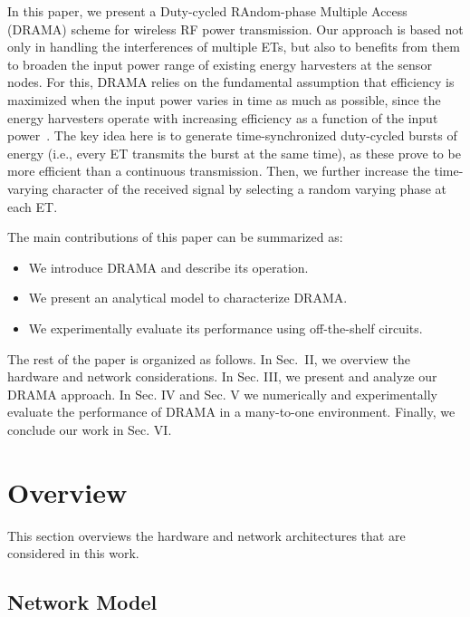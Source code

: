 \documentclass[conference]{IEEEtran}
\begin{document}
In this paper, we present a Duty-cycled RAndom-phase Multiple Access (DRAMA) scheme for wireless RF power transmission.  Our approach is based not only in handling the interferences of multiple ETs, but also to benefits from them to broaden the input power range of existing energy harvesters at the sensor nodes. For this, DRAMA relies on the fundamental assumption that efficiency is maximized when the input power varies in time as much as possible, since the energy harvesters operate with increasing efficiency as a function of the input power~\cite{P1110,kaushik-jetcas}.
 The key idea here is to generate time-synchronized duty-cycled bursts of energy (i.e., every ET transmits the burst at the same time), as these prove to be more efficient than a continuous transmission. Then,  we further increase the time-varying character of the received signal by selecting a random varying phase at each ET.

The main contributions of this paper can be summarized as:
\begin{itemize}
\item We introduce DRAMA and describe its operation.
\item We present an analytical model to characterize DRAMA.
\item We experimentally evaluate its performance using off-the-shelf circuits.
\end{itemize}


The rest of the paper is organized as follows. In Sec.~II, we overview the hardware and network considerations. In Sec. III, we present and analyze our DRAMA approach. In Sec. IV and Sec. V we numerically and experimentally evaluate the performance of DRAMA in a many-to-one environment.  Finally, we conclude our work in Sec. VI.

\section{Overview}
This section overviews the hardware and network architectures that are considered in this work.


\subsection{Network Model}
\end{document}
